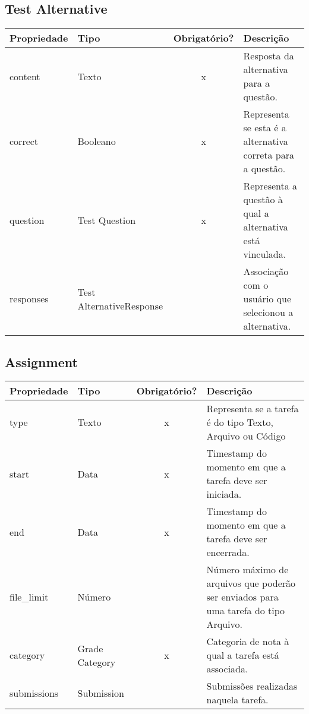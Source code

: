 \subsection{Test Alternative} \label{Test Alternative}
\begin{table}[H]
	\footnotesize
	\begin{tabularx}{\textwidth}{|X|X|c|p{7.8cm}|}   \hline \rowcolor[rgb]{0.8,0.8,0.8}
		
		\textbf{Propriedade} & \textbf{Tipo} & \textbf{Obrigatório?} & \centerline{\textbf{Descrição}} \\\hline  	
		
		content & Texto & x & Resposta da alternativa para a questão. \\\hline		
		correct & Booleano & x & Representa se esta é a alternativa correta para a questão.  \\\hline				
		question & Test Question & x & Representa a questão à qual a alternativa está vinculada. \\\hline
		responses & Test AlternativeResponse & {} & Associação com o usuário que selecionou a alternativa. \\\hline
		
	\end{tabularx}	
\end{table}


\subsection{Assignment} \label{Assignment}
\begin{table}[H]
	\footnotesize
	\begin{tabularx}{\textwidth}{|X|X|c|p{7.8cm}|}   \hline \rowcolor[rgb]{0.8,0.8,0.8}
		
		\textbf{Propriedade} & \textbf{Tipo} & \textbf{Obrigatório?} & \centerline{\textbf{Descrição}} \\\hline  	
		
		type & Texto & x & Representa se a tarefa é do tipo Texto, Arquivo ou Código \\\hline			
		start & Data & x & Timestamp do momento em que a tarefa deve ser iniciada. \\\hline			
		end & Data & x & Timestamp do momento em que a tarefa deve ser encerrada. \\\hline			
		file\_limit & Número & {} & Número máximo de arquivos que poderão ser enviados para uma tarefa do tipo Arquivo. \\\hline	
		category & Grade Category & x & Categoria de nota à qual a tarefa está associada. \\\hline	
		submissions & Submission & {} & Submissões realizadas naquela tarefa. \\\hline	
		
	\end{tabularx}	
\end{table}








